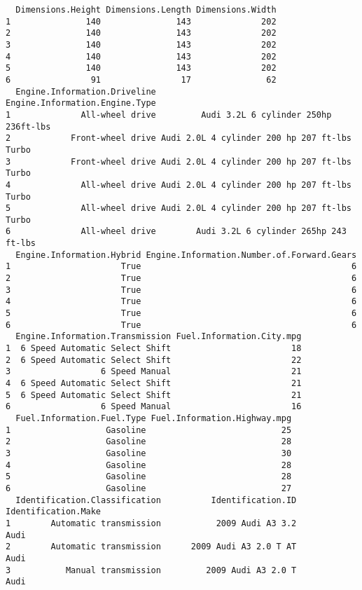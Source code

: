 \documentclass[
  letterpaper,
  DIV=11,
  numbers=noendperiod]{scrartcl}
\begin{document}
\begin{verbatim}
  Dimensions.Height Dimensions.Length Dimensions.Width
1               140               143              202
2               140               143              202
3               140               143              202
4               140               143              202
5               140               143              202
6                91                17               62
  Engine.Information.Driveline               Engine.Information.Engine.Type
1              All-wheel drive         Audi 3.2L 6 cylinder 250hp 236ft-lbs
2            Front-wheel drive Audi 2.0L 4 cylinder 200 hp 207 ft-lbs Turbo
3            Front-wheel drive Audi 2.0L 4 cylinder 200 hp 207 ft-lbs Turbo
4              All-wheel drive Audi 2.0L 4 cylinder 200 hp 207 ft-lbs Turbo
5              All-wheel drive Audi 2.0L 4 cylinder 200 hp 207 ft-lbs Turbo
6              All-wheel drive        Audi 3.2L 6 cylinder 265hp 243 ft-lbs
  Engine.Information.Hybrid Engine.Information.Number.of.Forward.Gears
1                      True                                          6
2                      True                                          6
3                      True                                          6
4                      True                                          6
5                      True                                          6
6                      True                                          6
  Engine.Information.Transmission Fuel.Information.City.mpg
1  6 Speed Automatic Select Shift                        18
2  6 Speed Automatic Select Shift                        22
3                  6 Speed Manual                        21
4  6 Speed Automatic Select Shift                        21
5  6 Speed Automatic Select Shift                        21
6                  6 Speed Manual                        16
  Fuel.Information.Fuel.Type Fuel.Information.Highway.mpg
1                   Gasoline                           25
2                   Gasoline                           28
3                   Gasoline                           30
4                   Gasoline                           28
5                   Gasoline                           28
6                   Gasoline                           27
  Identification.Classification          Identification.ID Identification.Make
1        Automatic transmission           2009 Audi A3 3.2                Audi
2        Automatic transmission      2009 Audi A3 2.0 T AT                Audi
3           Manual transmission         2009 Audi A3 2.0 T                Audi

\end{verbatim}
\end{document}
